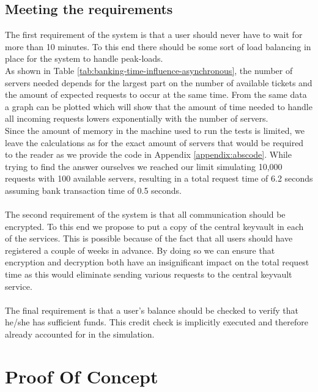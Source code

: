 \documentclass[conference]{IEEEtran}
\begin{document}
\subsection{Meeting the requirements}
The first requirement of the system is that a user should never have to wait for more than 10 minutes. To this end there should be some sort of load balancing in place for the system to handle peak-loads.\\
As shown in Table \ref{tab:banking-time-influence-asynchronous}, the number of servers needed depends for the largest part on the number of available tickets and the amount of expected requests to occur at the same time. From the same data a graph can be plotted which will show that the amount of time needed to handle all incoming requests lowers exponentially with the number of servers. \\
Since the amount of memory in the machine used to run the tests is limited, we leave the calculations as for the exact amount of servers that would be required to the reader as we provide the code in Appendix \ref{appendix:abscode}. While trying to find the answer ourselves we reached our limit simulating 10,000 requests with 100 available servers, resulting in a total request time of 6.2 seconds assuming bank transaction time of 0.5 seconds.\\
\\
The second requirement of the system is that all communication should be encrypted. To this end we propose to put a copy of the central keyvault in each of the services. This is possible because of the fact that all users should have registered a couple of weeks in advance. By doing so we can ensure that encryption and decryption both have an insignificant impact on the total request time as this would eliminate sending various requests to the central keyvault service.\\
\\
The final requirement is that a user's balance should be checked to verify that he/she has sufficient funds. This credit check is implicitly executed and therefore already accounted for in the simulation. 

\section{Proof Of Concept}
\label{POC}
\end{document}

